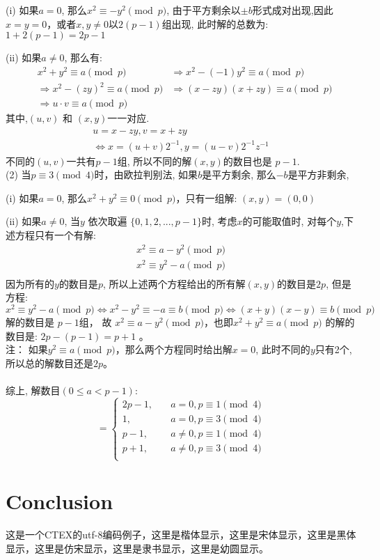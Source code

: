 \documentclass[UTF8]{article}
\begin{document}
(i) 如果$a = 0 $, 那么$x^2\equiv -y^2 \pmod{p}$, 由于平方剩余以$\pm b$形式成对出现,因此$x=y=0$，或者$x,y\ne 0$以$2(p-1)$组出现,
此时解的总数为: $1+2(p-1)=2p-1$

(ii) 如果$a\ne 0 $, 那么有:
\begin{eqnarray*}
	&x^2+y^2 \equiv a \pmod{p} & \Longrightarrow x^2 - (-1)y^2 \equiv a \pmod{p}\\
	&\Longrightarrow x^2 - (zy)^2 \equiv a \pmod{p} & \Longrightarrow (x-zy)(x+zy) \equiv a \pmod{p}\\
	&\Longrightarrow u\cdot v \equiv a \pmod{p}
\end{eqnarray*}
其中,$(u,v)$ 和 $(x,y)$一一对应.
\begin{eqnarray*}
	u=x-zy,v=x+zy \\
	\Longleftrightarrow x=(u+v)2^{-1}, y=(u-v)2^{-1}z^{-1}
\end{eqnarray*}
不同的$(u,v)$一共有$p-1$组, 所以不同的解$(x,y)$的数目也是 $p-1$.
\\
(2) 当$p\equiv3 \pmod{4}$时，由欧拉判别法, 如果$b$是平方剩余, 那么$-b$是平方非剩余,

(i) 如果$a = 0 $, 那么$x^2+y^2 \equiv 0 \pmod p$，只有一组解: $(x,y)=(0,0)$

(ii) 如果$a\ne 0 $, 当$y$ 依次取遍 $\{0,1,2,...,p-1\}$时, 考虑$x$的可能取值时, 对每个$y$,下述方程只有一个有解:\\
\begin{eqnarray*}
	x^2 \equiv a - y^2 \pmod p \\
	x^2 \equiv y^2 - a \pmod p \\
\end{eqnarray*}
因为所有的$y$的数目是$p$, 所以上述两个方程给出的所有解$(x,y)$的数目是$2p$, 但是方程:\\
$$x^2 \equiv y^2 - a \pmod p \Longleftrightarrow x^2 - y^2 \equiv - a \equiv b\pmod p \Longleftrightarrow (x+y)(x-y) \equiv b \pmod p$$
解的数目是 $p-1$组， 故 $x^2 \equiv a - y^2 \pmod p$，也即$x^2 +  y^2\equiv a  \pmod p$ 的解的数目是: $2p-(p-1) = p+1$ 。\\
注： 如果$y^2 \equiv a \pmod p$，那么两个方程同时给出解$x=0$, 此时不同的$y$只有2个,所以总的解数目还是$2p$。\\
\\
综上, 解数目$(0 \le a < p-1)$:
$$ =\left\{
\begin{aligned}
2p-1, & \quad a = 0 , p \equiv 1 \pmod 4 \\
1, &\quad  a = 0 , p \equiv 3 \pmod 4 \\
p-1, &\quad  a\ne 0 , p \equiv 1 \pmod 4 \\
p+1, &\quad  a\ne 0 , p \equiv 3 \pmod 4 \\
\end{aligned}
\right.
$$

\section{Conclusion}	
	这是一个CTEX的utf-8编码例子，{\kaishu 这里是楷体显示}，{\songti 这里是宋体显示}，{\heiti 这里是黑体显示}，{\fangsong 这里是仿宋显示}，{\lishu 这里是隶书显示}，{\youyuan 这里是幼圆显示}。
\end{document}
